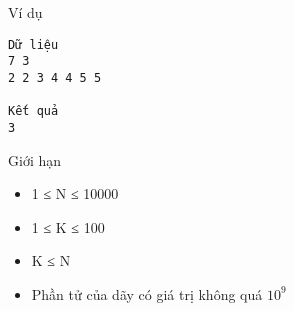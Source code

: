 Ví dụ  
\begin{verbatim}
Dữ liệu
7 3
2 2 3 4 4 5 5

Kết quả
3
\end{verbatim}
   Giới hạn  
\begin{itemize}
	\item     1 ≤ N ≤ 10000   
	\item     1 ≤ K ≤ 100   
	\item     K ≤ N   
	\item     Phần tử của dãy có giá trị không quá $10^{9}$
\end{itemize}
